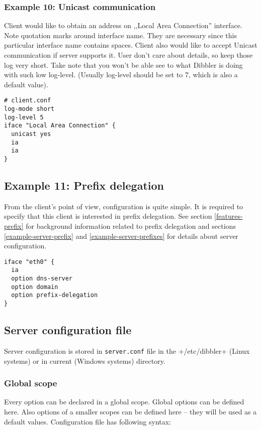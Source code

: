 \subsubsection{Example 10: Unicast communication}

Client would like to obtain an address on ,,Local Area Connection''
interface. Note quotation marks around
interface name. They are necessary since this particular interface name
contains spaces. Client also would like to accept Unicast
communication if server supports it. User don't care about
details, so keep those log very short. Take note that you won't be
able see to what Dibbler is doing with such low log-level. (Usually
log-level should be set to 7, which is also a default value).

\begin{lstlisting}
# client.conf
log-mode short
log-level 5
iface "Local Area Connection" {
  unicast yes
  ia
  ia
}
\end{lstlisting}

\subsection{Example 11: Prefix delegation}
\label{example-client-prefix}
From the client's point of view, configuration is quite simple. It is
required to specify that this client is interested in prefix
delegation. See section \ref{features-prefix} for background
information related to prefix delegation and sections
\ref{example-server-prefix} and \ref{example-server-prefixes} for
details about server configuration.

\begin{lstlisting}
iface "eth0" {
  ia
  option dns-server
  option domain
  option prefix-delegation 
}
\end{lstlisting}

\subsection{Server configuration file}

Server configuration is stored in \verb+server.conf+ file in the
+/etc/dibbler+ (Linux systems) or in current (Windows systems)
directory. 

\subsubsection{Global scope}

Every option can be declared in a global scope. Global options can be
defined here. Also options of a smaller scopes can be defined here --
they will be used as a default values. Configuration file has following syntax:

